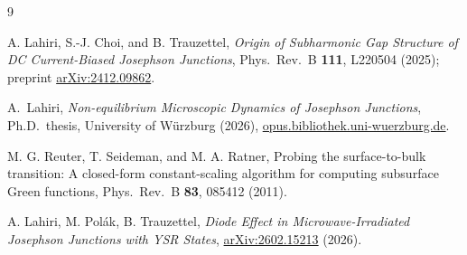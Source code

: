 \documentclass[11pt,a4paper]{article}
\begin{document}
\begin{thebibliography}{9}

A. Lahiri, S.-J. Choi, and B. Trauzettel, \emph{Origin of Subharmonic Gap Structure of DC
Current-Biased Josephson Junctions}, Phys.\ Rev.\ B {\bf111}, L220504 (2025);
preprint \href{https://arxiv.org/abs/2412.09862}{arXiv:2412.09862}.

A.~Lahiri, \emph{Non-equilibrium Microscopic Dynamics of Josephson Junctions},
Ph.D.\ thesis, University of W\"urzburg (2026),
\href{https://opus.bibliothek.uni-wuerzburg.de/frontdoor/index/index/year/2026/docId/44041}{opus.bibliothek.uni-wuerzburg.de}.

M. G. Reuter, T. Seideman, and M. A. Ratner, Probing the surface-to-bulk transition: A closed-form constant-scaling algorithm for computing subsurface Green functions, Phys.\ Rev.\ B {\bf83}, 085412 (2011).

A. Lahiri, M. Pol\'ak, B. Trauzettel, \emph{Diode Effect in Microwave-Irradiated Josephson
Junctions with YSR States},
\href{https://arxiv.org/abs/2602.15213}{arXiv:2602.15213} (2026).

\end{thebibliography}
\end{document}
